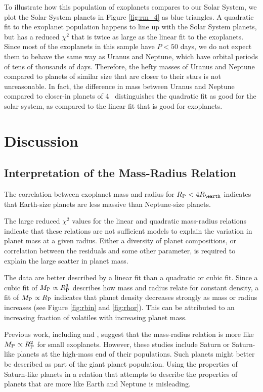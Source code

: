 \documentclass[11pt]{aastex}
\begin{document}
To illustrate how this population of exoplanets compares to our Solar System, we plot the Solar System planets in Figure \ref{fig:rm_4} as blue triangles.  A quadratic fit to the exoplanet population happens to line up with the Solar System planets, but has a reduced $\chi^2$ that is twice as large as the linear fit to the exoplanets.  Since most of the exoplanets in this sample have $P < 50$ days, we do not expect them to behave the same way as Uranus and Neptune, which have orbital periods of tens of thousands of days.  Therefore, the hefty masses of Uranus and Neptune compared to planets of similar size that are closer to their stars is not unreasonable.  In fact, the difference in mass between Uranus and Neptune compared to closer-in planets of 4 \rearth\ distinguishes the quadratic fit as good for the solar system, as compared to the linear fit that is good for exoplanets.

\section{Discussion}
	
\subsection{Interpretation of the Mass-Radius Relation}
The correlation between exoplanet mass and radius for $\rpl < 4 \rearth$ indicates that Earth-size planets are less massive than Neptune-size planets.

The large reduced $\chi^2$ values for the linear and quadratic mass-radius relations indicate that these relations are not sufficient models to explain the variation in planet mass at a given radius.  Either a diversity of planet compositions, or correlation between the residuals and some other parameter, is required to explain the large scatter in planet mass.

The data are better described by a linear fit than a quadratic or cubic fit.  Since a cubic fit of $M_{\rm P} \propto R_{\rm P}^3$ describes how mass and radius relate for constant density, a fit of $M_{\rm P} \propto R_{\rm P}$ indicates that planet density decreases strongly as mass or radius increases (see Figure \ref{fig:rbin} and \ref{fig:rhor}).  This can be attributed to an increasing fraction of volatiles with increasing planet mass.

Previous work, including \citet{Lissauer2011} and \citet{Weiss2013}, suggest that the mass-radius relation is more like $M_{\rm P} \propto R_{\rm P}^2$ for small exoplanets.  However, these studies include Saturn or Saturn-like planets at the high-mass end of their populations.  Such planets might better be described as part of the giant planet population.  Using the properties of Saturn-like planets in a relation that attempts to describe the properties of planets that are more like Earth and Neptune is misleading.  
\end{document}
